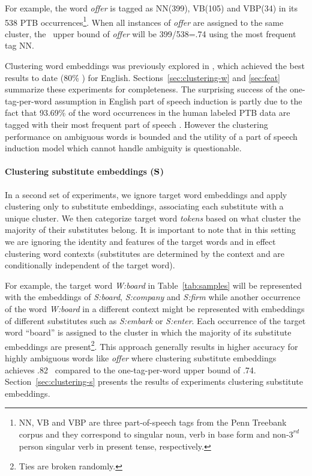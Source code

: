 For example, the word {\em offer} is tagged as NN(399), VB(105) and
VBP(34) in its 538 PTB occurrences\footnote{NN, VB and VBP are three
  part-of-speech tags from the Penn Treebank corpus and they
  correspond to singular noun, verb in base form and
  non-$3^{rd}$person singular verb in present tense, respectively.}.
When all instances of {\em offer} are assigned to the same cluster,
the \mto\ upper bound of {\em offer} will be 399/538=.74 using the
most frequent tag NN.

Clustering word embeddings was previously explored in
\cite{yatbaz-sert-yuret:2012:EMNLP-CoNLL}, which achieved the best
results to date (80\% \mto) for English.
Sections~\ref{sec:clustering-w} and \ref{sec:feat} summarize these
experiments for completeness.  The surprising success of the
one-tag-per-word assumption in English part of speech induction is
partly due to the fact that 93.69\% of the word occurrences in the
human labeled PTB data are tagged with their most frequent part of
speech \cite{Toutanova:2003:FPT:1073445.1073478}.  However the
clustering performance on ambiguous words is bounded and the utility
of a part of speech induction model which cannot handle ambiguity is
questionable.

\paragraph{Clustering substitute embeddings (${\bf S}$)}  
In a second set of experiments, we ignore target word embeddings and
apply clustering only to substitute embeddings, associating each
substitute with a unique cluster.  We then categorize target word {\em
  tokens} based on what cluster the majority of their substitutes
belong.  It is important to note that in this setting we are ignoring
the identity and features of the target words and in effect clustering
word contexts (substitutes are determined by the context and are
conditionally independent of the target word).

For example, the target word {\it W:board} in Table~\ref{tab:samples}
will be represented with the embeddings of {\it S:board}, {\it
  S:company} and {\it S:firm} while another occurrence of the word
{\it W:board} in a different context might be represented with
embeddings of different substitutes such as {\it S:embark} or {\it
  S:enter}.  Each occurrence of the target word ``board'' is assigned
to the cluster in which the majority of its substitute embeddings are
present\footnote{Ties are broken randomly.}.  This approach generally
results in higher accuracy for highly ambiguous words like {\em offer}
where clustering substitute embeddings achieves .82 \mto\ compared
to the one-tag-per-word upper bound of .74.
Section~\ref{sec:clustering-s} presents the results of experiments
clustering substitute embeddings.

